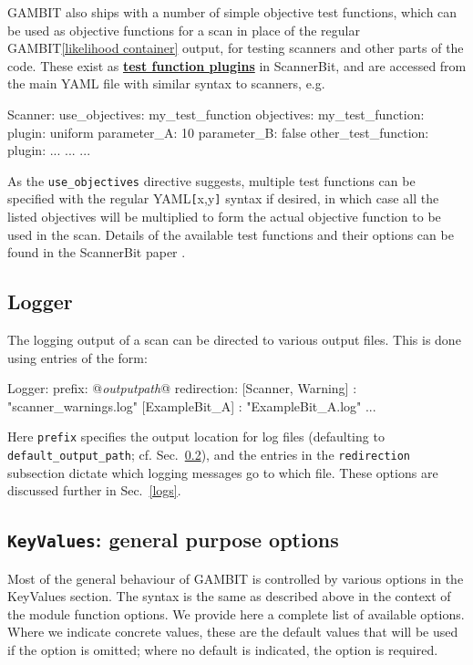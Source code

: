 \documentclass[pdftex,twocolumn,epjc3_preprint,runningheads]{svjour3}
\renewcommand{\_}{\discretionary{\underscore}{}{\underscore}}
\newcommand\cpp[1]{{\lstinline!#1!}}  %
\newcommand\yaml[1]{{\lstset{style=yaml}\lstinline!#1!\lstset{style=cpp}}}
\newcommand\yamlvalue[1]{{\YAMLvaluestyle\ttfamily#1}}
\newcommand\YAMLvaluestyle{\footnotesize\color{blue}\mdseries}
\newcommand{\cross}[1]{\ref{#1}}
\newcommand{\doublecross}[2]{\hyperref[#2]{\textbf{#1}}}
\newcommand{\metavarf}[1]{\textit{\color{darkgreen}\footnotesize\textrm{#1}}}
\newcommand{\metavar}{\metavarf}
\newcommand{\gambit}{\textsf{GAMBIT}\xspace}
\newcommand{\scannerbit}{\textsf{ScannerBit}\xspace}
\newcommand{\GB}{\gambit}
\newcommand\YAML{\textsf{YAML}\xspace}
\begin{document}
\GB also ships with a number of simple objective test functions, which can be used as objective functions for a scan in place of the regular \GB \cross{likelihood container} output, for testing scanners and other parts of the code.  These exist as \doublecross{test function plugins}{test function plugin} in \scannerbit, and are accessed from the main \YAML file with similar syntax to scanners, e.g.
\begin{lstyaml}
Scanner:
  use_objectives: my_test_function
  objectives:
    my_test_function:
      plugin: uniform
      parameter_A: 10
      parameter_B: false
    other_test_function:
      plugin: ...
      ...
    ...
\end{lstyaml}
As the \yaml{use_objectives} directive suggests, multiple test functions can be specified with the regular \YAML \yaml{[}\yamlvalue{x},\yamlvalue{y}\yaml{]} syntax if desired, in which case all the listed objectives will be multiplied to form the actual objective function to be used in the scan.  Details of the available test functions and their options can be found in the \scannerbit paper \cite{ScannerBit}.

\subsection{Logger}

The logging output of a scan can be directed to various output files.  This is
done using entries of the form:
\begin{lstyaml}
Logger:
  prefix: @\metavar{output\_path}@
  redirection:
    [Scanner, Warning] : "scanner_warnings.log"
    [ExampleBit_A] : "ExampleBit_A.log"
    ...
\end{lstyaml}
Here \yaml{prefix} specifies the output location for log files (defaulting to \yaml{default_output_path}; cf. Sec.\ \ref{keyvalues}), and the entries in the \yaml{redirection} subsection dictate which logging messages go to which file.  These options are discussed further in Sec.\ \ref{logs}.

\subsection{\cpp{KeyValues}: general purpose options}
\label{keyvalues}

Most of the general behaviour of \GB is controlled by various options in the
\yamlvalue{KeyValues} section.  The syntax is the same as described above in the
context of the module function options.  We provide here a complete list of
available options.  Where we indicate concrete values, these are the default
values that will be used if the option is omitted; where no default is indicated, the option is required.
\end{document}
